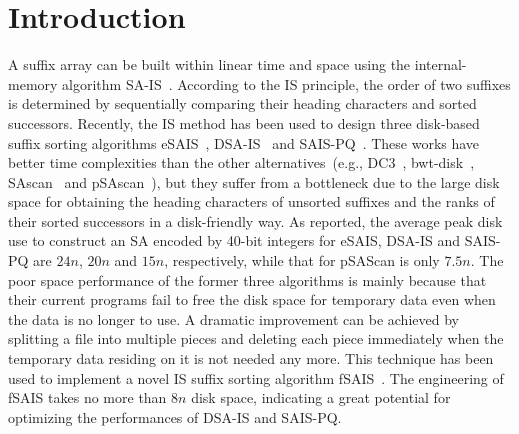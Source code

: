 \documentclass[10pt,journal,compsoc]{IEEEtran}
\begin{document}
\maketitle

\IEEEdisplaynontitleabstractindextext

\IEEEpeerreviewmaketitle

\section{Introduction}\label{sec:introduction}

A suffix array can be built within linear time and space using the internal-memory algorithm SA-IS~\cite{Nong11}. According to the IS principle, the order of two suffixes is determined by sequentially comparing their heading characters and sorted successors. Recently, the IS method has been used to design three disk-based suffix sorting algorithms eSAIS~\cite{Bingmann12}, DSA-IS~\cite{Nong15} and SAIS-PQ~\cite{Liu15}. These works have better time complexities than the other alternatives~(e.g., DC3~\cite{Dementiev2008a}, bwt-disk~\cite{Ferragina2012}, SAscan~\cite{Karkkainen2014} and pSAscan~\cite{Karkkainen2015}), but they suffer from a bottleneck due to the large disk space for obtaining the heading characters of unsorted suffixes and the ranks of their sorted successors in a disk-friendly way. As reported, the average peak disk use to construct an SA encoded by 40-bit integers for eSAIS, DSA-IS and SAIS-PQ are $24n$, $20n$ and $15n$, respectively, while that for pSAScan is only $7.5n$. The poor space performance of the former three algorithms is mainly because that their current programs fail to free the disk space for temporary data even when the data is no longer to use. A dramatic improvement can be achieved by splitting a file into multiple pieces and deleting each piece immediately when the temporary data residing on it is not needed any more. This technique has been used to implement a novel IS suffix sorting algorithm fSAIS~\cite{Karkkainen2017}. The engineering of fSAIS takes no more than $8n$ disk space, indicating a great potential for optimizing the performances of DSA-IS and SAIS-PQ.
\end{document}

